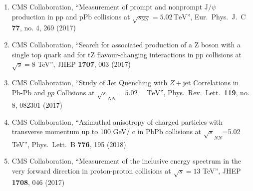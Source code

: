 \begin{enumerate}
\item CMS Collaboration, ``Measurement of prompt and nonprompt $\mathrm{J}/{\psi }$ production in $\mathrm {p}\mathrm {p}$ and $\mathrm {p}\mathrm {Pb}$ collisions at $\sqrt{s_{\mathrm {NN}}} =5.02\,\text {TeV} $'', Eur.\ Phys.\ J.\ C {\bf 77}, no. 4, 269 (2017)

\item CMS Collaboration, ``Search for associated production of a Z boson with a single top quark and for tZ flavour-changing interactions in pp collisions at $ \sqrt{s}=8 $ TeV'', JHEP {\bf 1707}, 003 (2017)

\item CMS Collaboration, ``Study of Jet Quenching with $Z+\text{jet}$ Correlations in Pb-Pb and $pp$ Collisions at ${\sqrt{s}}_{NN}=5.02\text{ }\text{ }\mathrm{TeV}$'', Phys.\ Rev.\ Lett.\  {\bf 119}, no. 8, 082301 (2017)

\item CMS Collaboration, ``Azimuthal anisotropy of charged particles with transverse momentum up to 100 GeV/ c in PbPb collisions at $\sqrt {s}_{{NN}}$=5.02 TeV'', Phys.\ Lett.\ B {\bf 776}, 195 (2018)

\item CMS Collaboration, ``Measurement of the inclusive energy spectrum in the very forward direction in proton-proton collisions at $ \sqrt{s}=13 $ TeV'', JHEP {\bf 1708}, 046 (2017)


\end{enumerate}
